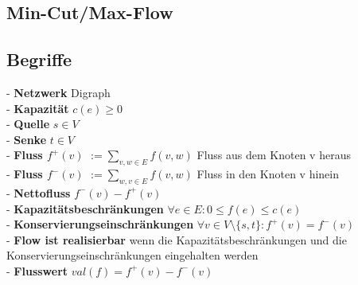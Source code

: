 \documentclass{article}
\begin{document}
\begin{multicols*}{3}
\section{Min-Cut/Max-Flow}
    \subsection{Begriffe}
    - \textbf{Netzwerk} Digraph    
    \\- \textbf{Kapazität} $c(e) \geq 0$
    \\- \textbf{Quelle} $s \in V$
    \\- \textbf{Senke} $t \in V$
    \\- \textbf{Fluss $f^+(v)$} $:= \sum_{v, w \in E} f(v, w)$ Fluss aus dem Knoten v heraus
    \\- \textbf{Fluss $f^-(v)$} $:= \sum_{w, v \in E} f(v, w)$ Fluss  in den Knoten v hinein
    \\- \textbf{Nettofluss} $f^-(v) - f^+(v)$
    \\- \textbf{Kapazitätsbeschränkungen} $\forall e \in E : 0 \leq f(e) \leq c(e)$
    \\- \textbf{Konservierungseinschränkungen} $\forall v \in V \setminus \{s, t\} : f^+(v) = f^-(v)$
    \\- \textbf{Flow ist realisierbar} wenn die Kapazitätsbeschränkungen und die Konservierungseinschränkungen eingehalten werden
    \\- \textbf{Flusswert} $val(f) = f^+(v) - f^-(v)$

\end{multicols*}
\end{document}
